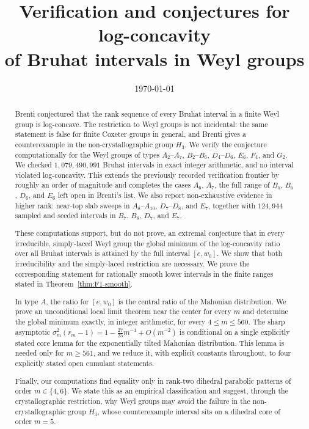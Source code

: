 \documentclass[11pt]{amsart}
\title[Log-concavity of Bruhat intervals in Weyl groups]
{Verification and conjectures for log-concavity\\ of Bruhat intervals in Weyl groups}
\author{}
\date{\today}
\theoremstyle{plain}
\theoremstyle{definition}
\theoremstyle{remark}
\begin{document}
\begin{abstract}
Brenti conjectured that the rank sequence of every Bruhat interval in a
finite Weyl group is log-concave. The restriction to Weyl groups is not
incidental: the same statement is false for finite Coxeter groups in
general, and Brenti gives a counterexample in the non-crystallographic
group $H_3$. We verify the conjecture
computationally for the Weyl groups of types $A_2$--$A_7$, $B_2$--$B_6$,
$D_4$--$D_6$, $E_6$, $F_4$, and $G_2$. We checked
$1{,}079{,}490{,}991$ Bruhat intervals in exact integer arithmetic, and no
interval violated log-concavity. This extends the previously recorded
verification frontier by roughly an order of magnitude and completes the
cases $A_6$, $A_7$, the full range of $B_5$, $B_6$, $D_6$, and $E_6$ left
open in Brenti's list. We also report non-exhaustive evidence in higher rank:
near-top slab sweeps in $A_8$--$A_{10}$, $D_7$--$D_8$, and $E_7$, together
with $124{,}944$ sampled and seeded intervals in $B_7$, $B_8$, $D_7$, and
$E_7$.

These computations support, but do not prove, an extremal conjecture that in every irreducible,
simply-laced Weyl group the global minimum of the
log-concavity ratio over all Bruhat intervals is attained by the full
interval $[e,w_0]$. We show that both irreducibility and the simply-laced
restriction are necessary. We prove the corresponding statement for
rationally smooth lower intervals in the finite ranges stated in
Theorem~\ref{thm:F1-smooth}.

In type $A$, the ratio for $[e,w_0]$ is the central ratio of the Mahonian
distribution. We prove an unconditional local limit theorem near the center
for every $m$ and determine the global minimum exactly, in integer
arithmetic, for every $4\le m\le560$. The sharp asymptotic
$\sigma_m^2(r_m-1) = 1-\tfrac{27}{25}m^{-1}+O(m^{-2})$ is conditional on a
single explicitly stated core lemma for the exponentially tilted Mahonian
distribution. This lemma is needed only for $m\ge561$, and we reduce it,
with explicit constants throughout, to four explicitly stated open
cumulant statements.

Finally, our computations find equality only in rank-two dihedral parabolic
patterns of order $m\in\{4,6\}$. We state this as an empirical
classification and suggest, through the crystallographic restriction, why
Weyl groups may avoid the failure in the non-crystallographic group $H_3$,
whose counterexample interval sits on a dihedral core of order $m=5$.
\end{abstract}
\end{document}
